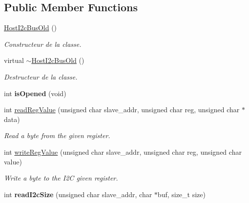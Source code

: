 \subsection*{Public Member Functions}
\begin{DoxyCompactItemize}
\item 
\mbox{\label{classHostI2cBusOld_a461e61c91e278b3d2eb08b9818210a3b}} 
\hyperlink{classHostI2cBusOld_a461e61c91e278b3d2eb08b9818210a3b}{Host\+I2c\+Bus\+Old} ()
\begin{DoxyCompactList}\small\item\em Constructeur de la classe. \end{DoxyCompactList}\item 
\mbox{\label{classHostI2cBusOld_a435d4a9dc0c2665ec0696f526d04f248}} 
virtual \hyperlink{classHostI2cBusOld_a435d4a9dc0c2665ec0696f526d04f248}{$\sim$\+Host\+I2c\+Bus\+Old} ()
\begin{DoxyCompactList}\small\item\em Destructeur de la classe. \end{DoxyCompactList}\item 
\mbox{\label{classHostI2cBusOld_ac46075b6311e25fab18c3069a7fb0b72}} 
int {\bfseries is\+Opened} (void)
\item 
int \hyperlink{classHostI2cBusOld_a9f680c445abf285e804f9a259d1ad777}{read\+Reg\+Value} (unsigned char slave\+\_\+addr, unsigned char reg, unsigned char $\ast$data)
\begin{DoxyCompactList}\small\item\em Read a byte from the given register. \end{DoxyCompactList}\item 
int \hyperlink{classHostI2cBusOld_a85fb525b83ff1c773a4cde7c39ac1a0e}{write\+Reg\+Value} (unsigned char slave\+\_\+addr, unsigned char reg, unsigned char value)
\begin{DoxyCompactList}\small\item\em Write a byte to the I2C given register. \end{DoxyCompactList}\item 
\mbox{\label{classHostI2cBusOld_a1fac86785cbcf9c9e8937d2bde04da89}} 
int {\bfseries read\+I2c\+Size} (unsigned char slave\+\_\+addr, char $\ast$buf, size\+\_\+t size)
\item 

\end{DoxyCompactItemize}
